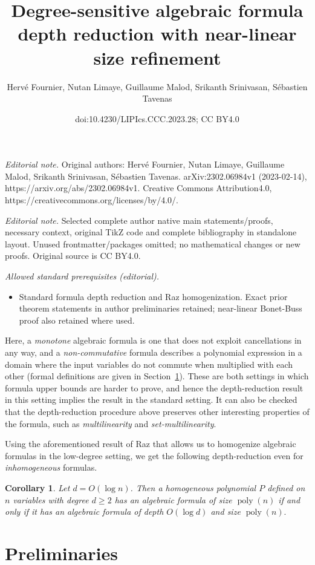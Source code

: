 \documentclass[10pt,a4paper]{article}
\title{Degree-sensitive algebraic formula depth reduction with near-linear size refinement}
\author{Hervé Fournier, Nutan Limaye, Guillaume Malod, Srikanth Srinivasan, Sébastien Tavenas}
\date{doi:10.4230/LIPIcs.CCC.2023.28; CC BY4.0}
\newtheorem{corollary}[theorem]{Corollary}
\newcommand{\poly}{\mathop{\mathrm{poly}}}
\begin{document}
\maketitle
\noindent\textit{Editorial note.} Original authors: Hervé Fournier, Nutan Limaye, Guillaume Malod, Srikanth Srinivasan, Sébastien Tavenas. arXiv:2302.06984v1 (2023-02-14), https://arxiv.org/abs/2302.06984v1. Creative Commons Attribution4.0, https://creativecommons.org/licenses/by/4.0/.\par\medskip
\noindent\textit{Editorial note.} Selected complete author native main statements/proofs, necessary context, original TikZ code and complete bibliography in standalone layout. Unused frontmatter/packages omitted; no mathematical changes or new proofs. Original source is CC BY4.0.\par\medskip
\noindent\textit{Allowed standard prerequisites (editorial).}\begin{itemize}
\item Standard formula depth reduction and Raz homogenization. Exact prior theorem statements in author preliminaries retained; near-linear Bonet-Buss proof also retained where used.
\end{itemize}\medskip
Here, a \emph{monotone} algebraic formula is one that does not exploit cancellations in any way, and a \emph{non-commutative} formula describes a polynomial expression in a domain where the input variables do not commute when multiplied with each other (formal definitions are given in Section~\ref{sec:prelims}). These are both settings in which formula upper bounds are harder to prove, and hence the depth-reduction result in this setting implies the result in the standard setting.
It can also be checked that the depth-reduction procedure above preserves other interesting properties of the formula, such as \emph{multilinearity} and \emph{set-multilinearity}.

Using the aforementioned result of Raz that allows us to homogenize algebraic formulas in the low-degree setting, we get the following depth-reduction even for \emph{inhomogeneous} formulas.

\begin{corollary}
\label{cor:inhom}
Let $d = O(\log n)$. Then a homogeneous polynomial $P$ defined on $n$ variables with degree $d \geq 2$ has an algebraic formula of size $\poly(n)$ if and only if it has an algebraic formula of depth $O(\log d)$ and size $\poly(n).$
\end{corollary}

\section{Preliminaries}
\label{sec:prelims}
\end{document}
